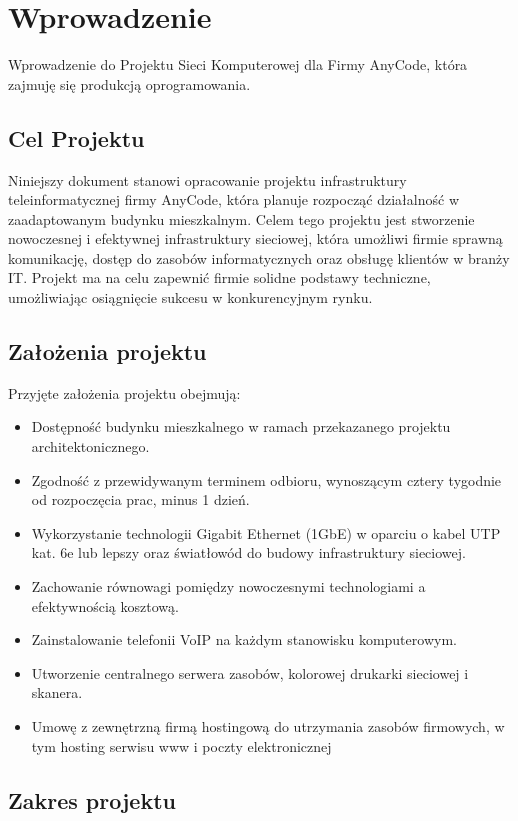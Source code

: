 
\section{Wprowadzenie}
Wprowadzenie do Projektu Sieci Komputerowej dla Firmy AnyCode, która zajmuję się produkcją oprogramowania.

\subsection{Cel Projektu}
Niniejszy dokument stanowi opracowanie projektu infrastruktury teleinformatycznej firmy AnyCode, która planuje rozpocząć działalność w zaadaptowanym budynku mieszkalnym. Celem tego projektu jest stworzenie nowoczesnej i efektywnej infrastruktury sieciowej, która umożliwi firmie sprawną komunikację, dostęp do zasobów informatycznych oraz obsługę klientów w branży IT. Projekt ma na celu zapewnić firmie solidne podstawy techniczne, umożliwiając osiągnięcie sukcesu w konkurencyjnym rynku.

\subsection{Założenia projektu}
Przyjęte założenia projektu obejmują:
\begin{itemize}
    \item Dostępność budynku mieszkalnego w ramach przekazanego projektu architektonicznego.
    \item Zgodność z przewidywanym terminem odbioru, wynoszącym cztery tygodnie od rozpoczęcia prac, minus 1 dzień.
    \item Wykorzystanie technologii Gigabit Ethernet (1GbE) w oparciu o kabel UTP kat. 6e lub lepszy oraz światłowód do budowy infrastruktury sieciowej.
    \item Zachowanie równowagi pomiędzy nowoczesnymi technologiami a efektywnością kosztową.
    \item Zainstalowanie telefonii VoIP na każdym stanowisku komputerowym.
    \item Utworzenie centralnego serwera zasobów, kolorowej drukarki sieciowej i skanera.
    \item Umowę z zewnętrzną firmą hostingową do utrzymania zasobów firmowych, w tym hosting serwisu www i poczty elektronicznej   
\end{itemize}

\subsection{Zakres projektu}

